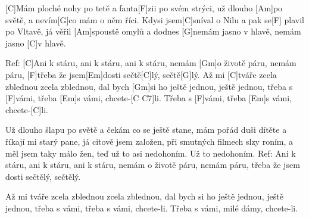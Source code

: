 
[C]Mám ploché nohy po tetě a fanta[F]zii po svém strýci,
už dlouho [Am] po světě, a nevím[G]co mám o něm říci.
Kdysi jsem[C]sníval o Nilu a pak se[F] plavil po Vltavě,
já věřil [Am]spoustě omylů a dodnes [G]nemám jasno v hlavě, nemám jasno [C]v hlavě.

Ref: [C]Ani k stáru, ani k stáru, ani k stáru,
nemám [Gm]o životě páru, nemám páru,
[F]třeba že jsem[Em]dosti sečtě[C]lý, sečtě[G]lý.
Až mi [C]tváře zcela zblednou zcela zblednou,
dal bych [Gm]si ho ještě jednou, ještě jednou,
třeba s [F]vámi, třeba [Em]s vámi, chcete-[C C7]li.
Třeba s [F]vámi, třeba [Em]s vámi, chcete-[C]li.

Už dlouho šlapu po světě a čekám co se ještě stane,
mám pořád duši dítěte a říkají mi starý pane,
já citově jsem založen, při smutných filmech slzy roním,
a měl jsem taky málo žen, teď už to asi nedohoním. Už to nedohoním.
Ref: Ani k stáru, ani k stáru, ani k stáru,
nemám o životě páru, nemám páru,
třeba že jsem dosti sečtělý, sečtělý.

Až mi tváře zcela zblednou zcela zblednou,
dal bych si ho ještě jednou, ještě jednou,
třeba s vámi, třeba s vámi, chcete-li.
Třeba s vámi, milé dámy, chcete-li.
